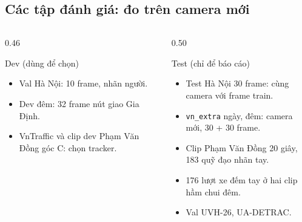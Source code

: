 \documentclass[aspectratio=\mlwAspectRatio, \mlwBaseSize, t]{beamer}
\begin{document}
\subsection{Các tập đánh giá: đo trên camera mới}
\begin{frame}{\stitle}
  \begin{columns}[T]
    \begin{column}{0.46\textwidth}
      \begin{block}{Dev (dùng để chọn)}
        \begin{itemize}
          \item Val Hà Nội: 10 frame, nhãn người.
          \item Dev đêm: 32 frame nút giao Gia Định.
          \item VnTraffic và clip dev Phạm Văn Đồng góc C: chọn tracker.
        \end{itemize}
      \end{block}
    \end{column}
    \begin{column}{0.50\textwidth}
      \begin{block}{Test (chỉ để báo cáo)}
        \begin{itemize}
          \item Test Hà Nội 30 frame: \alert{cùng camera} với frame train.
          \item \texttt{vn\_extra} ngày, đêm: \alert{camera mới}, 30 + 30 frame.
          \item Clip Phạm Văn Đồng 20 giây, 183 quỹ đạo nhãn tay.
          \item 176 lượt xe đếm tay ở hai clip hầm chui đêm.
          \item Val UVH-26, UA-DETRAC.
        \end{itemize}
      \end{block}
    \end{column}
  \end{columns}
\end{frame}
\end{document}
